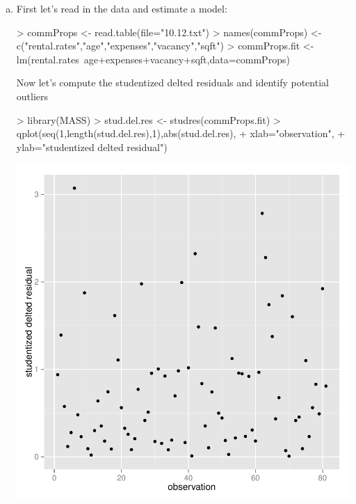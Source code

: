 \documentclass{article}
\begin{document}
\begin{enumerate}[a)]

\item{} First let's read in the data and estimate a model:
\begin{Schunk}
\begin{Sinput}
> commProps <- read.table(file="10.12.txt")
> names(commProps) <- c("rental.rates","age","expenses","vacancy","sqft")
> commProps.fit <- lm(rental.rates~age+expenses+vacancy+sqft,data=commProps)
\end{Sinput}
\end{Schunk}

Now let's compute the studentized delted residuals and identify potential outliers
\begin{Schunk}
\begin{Sinput}
> library(MASS)
> stud.del.res <- studres(commProps.fit)
> qplot(seq(1,length(stud.del.res),1),abs(stud.del.res),
+       xlab="observation",
+       ylab="studentized delted residual")
\end{Sinput}
\end{Schunk}
\includegraphics{Fig-massstuff}


\end{enumerate}
\end{document}
